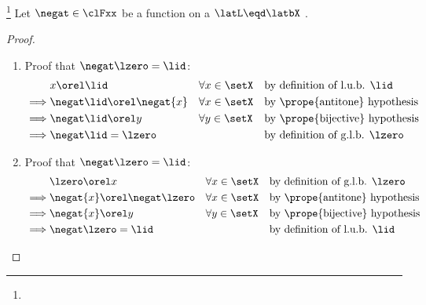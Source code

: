\begin{lemma}
\footnote{
  }
\label{lem:latn_biant_bnd}
Let $\negat\in\clFxx$ be a function on a  $\latL\eqd\latbX$ .
\end{lemma}
\begin{proof}
\begin{enumerate}
  \item Proof that $\negat\lzero=\lid$: 
    \begin{align*}
        &  x \orel \lid 
        && \forall x\in\setX 
        && \text{by definition of l.u.b. $\lid$}
      \\\implies 
        & \negat\lid \orel \negat{x} 
        && \forall x\in\setX 
        && \text{by \prope{antitone} hypothesis}
      \\\implies 
        &  \negat\lid \orel y 
        && \forall y\in\setX 
        && \text{by \prope{bijective} hypothesis}
      \\\implies 
        &  \negat\lid = \lzero
        && 
        && \text{by definition of g.l.b. $\lzero$}
    \end{align*}

  \item Proof that $\negat\lzero=\lid$: 
    \begin{align*}
        &  \lzero \orel x 
        && \forall x\in\setX 
        && \text{by definition of g.l.b. $\lzero$}
      \\\implies 
        &  \negat{x} \orel \negat\lzero 
        && \forall x\in\setX 
        && \text{by \prope{antitone} hypothesis}
      \\\implies 
        &  \negat{x} \orel y 
        && \forall y\in\setX 
        && \text{by \prope{bijective} hypothesis}
      \\\implies 
        &  \negat\lzero = \lid
        && 
        && \text{by definition of l.u.b. $\lid$}
    \end{align*}
\end{enumerate}
\end{proof}



